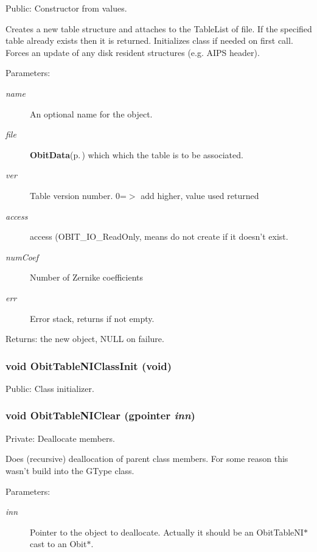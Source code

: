 Public: Constructor from values. 

Creates a new table structure and attaches to the Table\-List of file. If the specified table already exists then it is returned. Initializes class if needed on first call. Forces an update of any disk resident structures (e.g. AIPS header). \begin{Desc}
\item[Parameters:]
\begin{description}
\item[{\em name}]An optional name for the object. \item[{\em file}]{\bf Obit\-Data}{\rm (p.\,\pageref{structObitData})} which which the table is to be associated. \item[{\em ver}]Table version number. 0=$>$ add higher, value used returned \item[{\em access}]access (OBIT\_\-IO\_\-Read\-Only, means do not create if it doesn't exist. \item[{\em num\-Coef}]Number of Zernike coefficients \item[{\em err}]Error stack, returns if not empty. \end{description}
\end{Desc}
\begin{Desc}
\item[Returns:]the new object, NULL on failure. \end{Desc}
\subsubsection{\setlength{\rightskip}{0pt plus 5cm}void Obit\-Table\-NIClass\-Init (void)}\label{ObitTableNI_8c_a27}


Public: Class initializer. 

\subsubsection{\setlength{\rightskip}{0pt plus 5cm}void Obit\-Table\-NIClear (gpointer {\em inn})}\label{ObitTableNI_8c_a9}


Private: Deallocate members. 

Does (recursive) deallocation of parent class members. For some reason this wasn't build into the GType class. \begin{Desc}
\item[Parameters:]
\begin{description}
\item[{\em inn}]Pointer to the object to deallocate. Actually it should be an Obit\-Table\-NI$\ast$ cast to an Obit$\ast$. \end{description}
\end{Desc}
